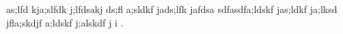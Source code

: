 as;lfd kja;slfdk j;lfdsakj ds;fl   a;sldkf
jads;lfk jafdsa sdfasdfa;ldskf jas;ldkf ja;lksd
jfla;skdjf  a;ldskf j;alskdf j i .
